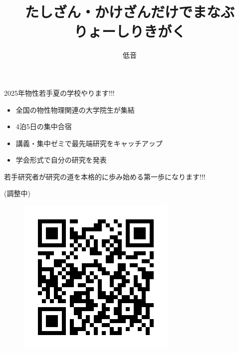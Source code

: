 \documentclass[dvipdfm]{beamer}
\title{たしざん・かけざんだけでまなぶ\\りょーしりきがく}
\author{低音}
\begin{document}
\begin{frame}
    \titlepage
\end{frame}

\begin{frame}{2025年物性若手夏の学校やります!!!}
    \begin{itemize}
        \item 全国の物性物理関連の大学院生が集結
        \item 4泊5日の集中合宿
        \item 講義・集中ゼミで最先端研究をキャッチアップ
        \item 学会形式で自分の研究を発表
    \end{itemize}
    若手研究者が研究の道を本格的に歩み始める第一歩になります!!!

    \textbf{}

    \textbf{}(調整中)
    \begin{figure}
        \centering
        \includegraphics[width=0.2\linewidth]{QR_736654.png}
    \end{figure}
\end{frame}
\end{document}
